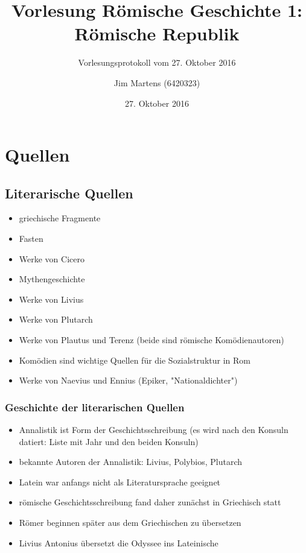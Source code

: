 \documentclass[10pt,a4paper,oneside,ngerman,numbers=noenddot]{scrartcl}
\newenvironment{myitemize}{\begin{itemize}\itemsep -9pt}{\end{itemize}} %
\begin{document}
\author{Jim Martens (6420323)}
\title{Vorlesung Römische Geschichte 1: Römische Republik}
\subtitle{Vorlesungsprotokoll vom 27. Oktober 2016}
\date{27. Oktober 2016}
\maketitle

\section*{Quellen}
\subsection*{Literarische Quellen}

\begin{myitemize}
    \item griechische Fragmente
    \item Fasten
    \item Werke von Cicero
    \item Mythengeschichte
    \item Werke von Livius
    \item Werke von Plutarch
    \item Werke von Plautus und Terenz (beide sind römische Komödienautoren)
    \item Komödien sind wichtige Quellen für die Sozialstruktur in Rom
    \item Werke von Naevius und Ennius (Epiker, "Nationaldichter")
\end{myitemize}

\subsubsection*{Geschichte der literarischen Quellen}
\begin{myitemize}
    \item Annalistik ist Form der Geschichtsschreibung (es wird nach den Konsuln datiert: Liste mit Jahr und den beiden Konsuln)
    \item bekannte Autoren der Annalistik: Livius, Polybios, Plutarch
    \item Latein war anfangs nicht als Literatursprache geeignet
    \item römische Geschichtsschreibung fand daher zunächst in Griechisch statt
    \item Römer beginnen später aus dem Griechischen zu übersetzen
    \item Livius Antonius übersetzt die Odyssee ins Lateinische 
\end{myitemize}
\end{document}
